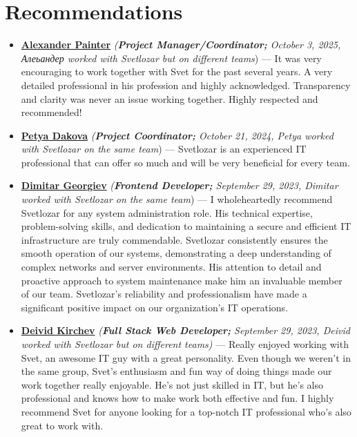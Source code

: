 \documentclass[letterpaper, 10pt]{article}
\begin{document}
	\section*{Recommendations}
\begin{itemize}
	
			\item \textbf{\href{https://www.linkedin.com/in/alexander-painter-46281b25b/}{Alexander Painter}} \textit{(\textbf{Project Manager/Coordinator;} October 3, 2025, Алеьандер worked with Svetlozar but on different teams}) — It was very encouraging to work together with Svet for the past several years. A very detailed professional in his profession and highly acknowledged. Transparency and clarity was never an issue working together. Highly respected and recommended! \\
	
		\item \textbf{\href{https://www.linkedin.com/in/petya-dakova-3b37162a2/}{Petya Dakova}} \textit{(\textbf{Project Coordinator;} October 21, 2024, Petya worked with Svetlozar on the same team}) — Svetlozar is an experienced IT professional that can offer so much and will be very beneficial for every team. \\
	
	\item \textbf{\href{https://www.linkedin.com/in/dimitar-georgiev-29a6ab144/}{Dimitar
			Georgiev}} \textit{(\textbf{Frontend Developer;} September 29, 2023, Dimitar worked with Svetlozar on the same team}) — I wholeheartedly recommend Svetlozar for any system
	administration role. His technical expertise, problem-solving skills, and dedication
	to maintaining a secure and efficient IT infrastructure are truly commendable.
	Svetlozar consistently ensures the smooth operation of our systems, demonstrating
	a deep understanding of complex networks and server environments. His
	attention to detail and proactive approach to system maintenance make him
	an invaluable member of our team. Svetlozar’s reliability and professionalism
	have made a significant positive impact on our organization’s IT operations.\\
	
	\item \textbf{\href{https://www.linkedin.com/in/deivid-kirchev-00378b252/}{Deivid
			Kirchev}} \textit{(\textbf{Full Stack Web Developer;} September 29, 2023, Deivid worked with Svetlozar but on different teams)} — Really enjoyed working with Svet, an awesome IT guy with a great
	personality. Even though we weren’t in the same group, Svet’s enthusiasm and
	fun way of doing things made our work together really enjoyable. He’s not
	just skilled in IT, but he’s also professional and knows how to make work both
	effective and fun. I highly recommend Svet for anyone looking for a top-notch
	IT professional who’s also great to work with.\\
	

\end{itemize}
\end{document}
